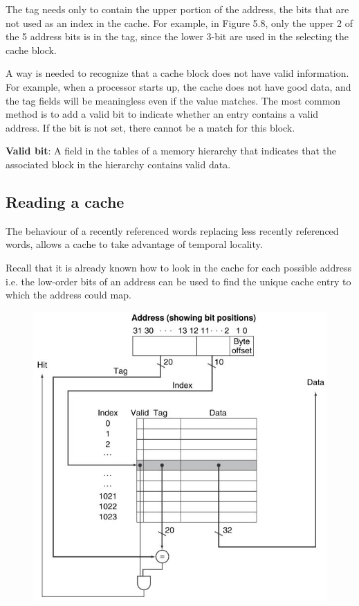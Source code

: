 \documentclass[10pt,a4paper]{article}
\begin{document}
The tag needs only to contain the upper portion of the address, the bits that are not used as an index in
the cache. For example, in Figure 5.8, only the upper 2 of the 5 address bits is in the tag, since
the lower 3-bit are used in the selecting the cache block. 

A way is needed to recognize that a cache block does not have valid information. For example, when a
processor starts up, the cache does not have good data, and the tag fields will be meaningless even
if the value matches.  The most common method is to add a valid bit to indicate whether an entry
contains a valid address. If the bit is not set, there cannot be a match for this block.

\begin{tcolorbox}[breakable,colback=white]
\textbf{Valid bit}:  A field in the tables of a memory hierarchy that indicates that the associated block 
in the hierarchy contains valid data.
\end{tcolorbox}

\pagebreak

\subsection{Reading a cache}

The behaviour of a recently referenced words replacing less recently referenced words, allows a 
cache to take advantage of temporal locality.

Recall that it is already known how to look in the cache for each possible address i.e. the low-order bits 
of an address can be used to find the unique cache entry to which the address could map.

\begin{figure} [h!]
    \centering
    \includegraphics[scale=0.7]{Cir.JPG}
\end{figure}
\end{document}
